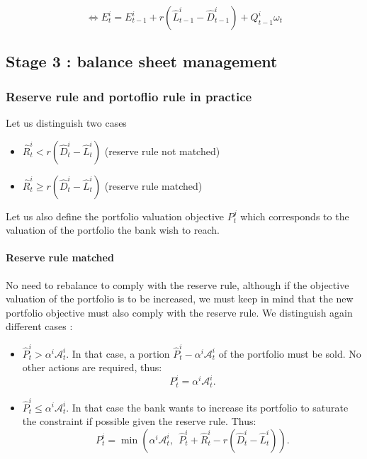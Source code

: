 \documentclass{article}
\newcommand{\wh}{\widehat}
\begin{document}
\begin{equation}\label{eq:eqtdyna}
\Leftrightarrow E^i_t = E^i_{t-1} + r (\wh L_{t-1}^i - \wh D_{t-1}^i) + Q_{t-1}^i \omega_t
\end{equation}

\subsection{Stage 3 : balance sheet management}\label{balance_sheet_management}

\subsubsection{Reserve rule and portoflio rule in practice}

Let us distinguish two cases

\begin{itemize}
    \item $\widehat{R}_t^i < r(\wh D_t^i - \wh L_t^i)$ (reserve rule not matched)
    \item $\widehat{R}_t^i \geq r(\wh D_t^i - \wh L_t^i)$ (reserve rule matched)
\end{itemize}

Let us also define the portfolio valuation objective $P_t^{j}$ which corresponds to the valuation of the portfolio the bank wish to reach.

\paragraph{Reserve rule matched}
No need to rebalance to comply with the reserve rule, although if the objective valuation of the portfolio is to be increased, we must keep in mind that the new portfolio objective must also comply with the reserve rule.
We distinguish again different cases : 
\begin{itemize}
    \item $\widehat{P}_t^i > \alpha^i \mathcal{A}_t^i$. In that case, a portion $\widehat{P}_t^i - \alpha^i \mathcal{A}_t^i$ of the portfolio must be sold. No other actions are required, thus:
     $$P_t^i = \alpha^i \mathcal{A}_t^i.$$
    \item $\widehat{P}_t^i \leq \alpha^i \mathcal{A}_t^i$. In that case the bank wants to increase its portfolio to saturate the constraint if possible given the reserve rule. Thus: $$P_t^{i} = \min \left(\alpha^i \mathcal{A}_t^i,~~\widehat{P}_t^i + \widehat{R}_t^i - r(\wh D_t^i - \wh L_t^i) \right).$$
\end{itemize}
\end{document}
